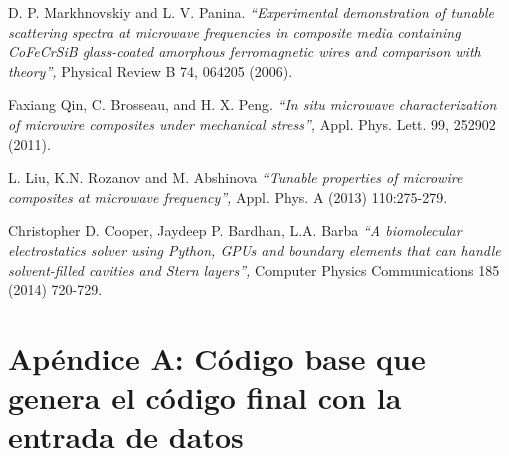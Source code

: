 \documentclass[12pt,letterpaper]{article}
\numberwithin{equation}{section}
\begin{document}
\begin{thebibliography}{9}
	D. P. Markhnovskiy and L. V. Panina.
	\textit{``Experimental demonstration of tunable scattering spectra at microwave frequencies in composite media containing CoFeCrSiB glass-coated amorphous ferromagnetic wires and comparison with theory'',} 
	Physical Review B 74, 064205 (2006).	
	
	Faxiang Qin, C. Brosseau, and H. X. Peng.
	\textit{``In situ microwave characterization of microwire composites under mechanical stress'',} 
	Appl. Phys. Lett. 99, 252902 (2011).
	
	L. Liu, K.N. Rozanov and M. Abshinova
	\textit{``Tunable properties of microwire composites at microwave frequency'',} 
	Appl. Phys. A (2013) 110:275-279.		
	
	Christopher D. Cooper, Jaydeep P. Bardhan, L.A. Barba
	\textit{``A biomolecular electrostatics solver using Python, GPUs and boundary
	elements that can handle solvent-filled cavities and Stern layers'',} 
	Computer Physics Communications 185 (2014) 720-729.	
	
	\end{thebibliography}


\pagebreak

\part*{Apéndice A: Código base que genera el código final con la entrada de datos}
\end{document}
